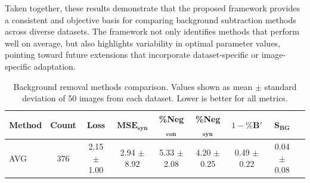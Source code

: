 \documentclass[iucr,review]{iucrjournals}
\begin{document}
Taken together, these results demonstrate that the proposed framework provides a consistent and objective basis for comparing background subtraction methods across diverse datasets. The framework not only identifies methods that perform well on average, but also highlights variability in optimal parameter values, pointing toward future extensions that incorporate dataset-specific or image-specific adaptation.


\begin{table}[t]
\caption{Background removal methods comparison. Values shown as mean $\pm$ standard deviation of 50 images from each dataset.
Lower is better for all metrics.}
\label{tab:method_performance_new}
\centering
\small
\setlength{\tabcolsep}{3pt}
\renewcommand{\arraystretch}{1.1}
\begin{tabular}{@{}lcccccccc@{}}
\toprule
\textbf{Method} & \textbf{Count} & \textbf{Loss} & $\mathbf{MSE}_{\mathbf{syn}}$ & \textbf{\%Neg$_{\mathbf{con}}$} & \textbf{\%Neg$_{\mathbf{syn}}$} & \textbf{$1-\%\mathbf{B}'$} & \textbf{$\mathbf{S}_{\mathbf{BG}}$} \\ \midrule
AVG & 376 & 2.15 $\pm$ 1.00 & 2.94 $\pm$ 8.92 & 5.33 $\pm$ 2.08 & 4.20 $\pm$ 0.25 & 0.49 $\pm$ 0.22 & 0.04 $\pm$ 0.08 \\

\end{tabular}
\end{table}
\end{document}
